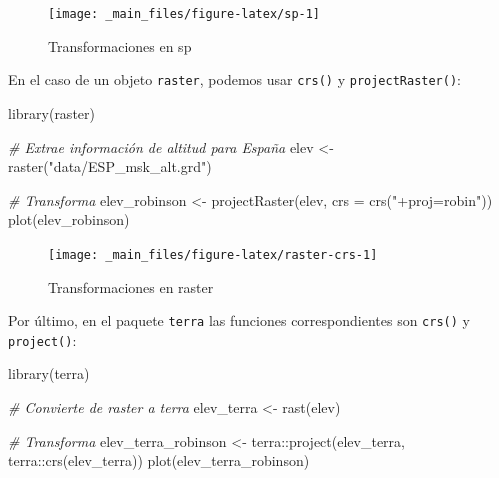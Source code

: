 \documentclass[
]{book}
\newenvironment{Shaded}{\begin{snugshade}}{\end{snugshade}}
\newcommand{\AttributeTok}[1]{\textcolor[rgb]{0.77,0.63,0.00}{#1}}
\newcommand{\CommentTok}[1]{\textcolor[rgb]{0.56,0.35,0.01}{\textit{#1}}}
\newcommand{\FunctionTok}[1]{\textcolor[rgb]{0.00,0.00,0.00}{#1}}
\newcommand{\NormalTok}[1]{#1}
\newcommand{\OtherTok}[1]{\textcolor[rgb]{0.56,0.35,0.01}{#1}}
\newcommand{\SpecialCharTok}[1]{\textcolor[rgb]{0.00,0.00,0.00}{#1}}
\newcommand{\StringTok}[1]{\textcolor[rgb]{0.31,0.60,0.02}{#1}}
\begin{document}
\begin{figure}

{\centering \texttt{[image: \_main\_files/figure-latex/sp-1]} 

}

\caption{Transformaciones en sp}\label{fig:sp}
\end{figure}

En el caso de un objeto \texttt{raster}, podemos usar \texttt{crs()} y \texttt{projectRaster()}:

\begin{Shaded}
\begin{Highlighting}[]
\FunctionTok{library}\NormalTok{(raster)}


\CommentTok{\# Extrae información de altitud para España}
\NormalTok{elev }\OtherTok{\textless{}{-}} \FunctionTok{raster}\NormalTok{(}\StringTok{"data/ESP\_msk\_alt.grd"}\NormalTok{)}


\CommentTok{\# Transforma}
\NormalTok{elev\_robinson }\OtherTok{\textless{}{-}} \FunctionTok{projectRaster}\NormalTok{(elev, }\AttributeTok{crs =} \FunctionTok{crs}\NormalTok{(}\StringTok{"+proj=robin"}\NormalTok{))}
\FunctionTok{plot}\NormalTok{(elev\_robinson)}
\end{Highlighting}
\end{Shaded}

\begin{figure}

{\centering \texttt{[image: \_main\_files/figure-latex/raster-crs-1]} 

}

\caption{Transformaciones en raster}\label{fig:raster-crs}
\end{figure}

Por último, en el paquete \texttt{terra} las funciones correspondientes son \texttt{crs()} y
\texttt{project()}:

\begin{Shaded}
\begin{Highlighting}[]
\FunctionTok{library}\NormalTok{(terra)}

\CommentTok{\# Convierte de raster a terra}
\NormalTok{elev\_terra }\OtherTok{\textless{}{-}} \FunctionTok{rast}\NormalTok{(elev)}


\CommentTok{\# Transforma}
\NormalTok{elev\_terra\_robinson }\OtherTok{\textless{}{-}}\NormalTok{ terra}\SpecialCharTok{::}\FunctionTok{project}\NormalTok{(elev\_terra, terra}\SpecialCharTok{::}\FunctionTok{crs}\NormalTok{(elev\_terra))}
\FunctionTok{plot}\NormalTok{(elev\_terra\_robinson)}
\end{Highlighting}
\end{Shaded}
\end{document}
